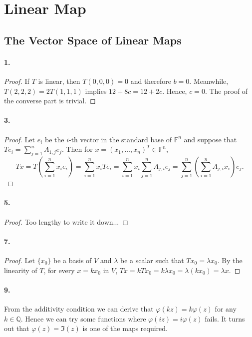 \section{Linear Map}
\subsection{The Vector Space of Linear Maps}
  \paragraph{1.}
  \begin{proof}
    If $T$ is linear, then $T(0,0,0)=0$ and therefore $b=0$. Meanwhile, 
    $T(2,2,2)=2T(1,1,1)$ implies $12+8c=12+2c$. Hence, $c=0$. The proof of the 
    converse part is trivial.
  \end{proof}

  \paragraph{3.}
  \begin{proof}
    Let $e_i$ be the $i$-th vector in the standard base of $\mathbb{F}^n$ and 
    suppose that $Te_i = \sum_{j=1}^n A_{1,j}e_j$. Then for $x=(x_1,\dots,x_n)^T 
    \in\mathbb{F}^n$,
    \[
      Tx = T\left(\sum_{i=1}^n x_ie_i\right) = \sum_{i=1}^n x_iTe_i =
      \sum_{i=1}^n x_i\sum_{j=1}^nA_{j,i}e_j = 
      \sum_{j=1}^n\left(\sum_{i=1}^nA_{j,i}x_i\right) e_j.
    \]
  \end{proof}

  \paragraph{5.}
  \begin{proof}
    Too lengthy to write it down...
  \end{proof}

  \paragraph{7.}
  \begin{proof}
    Let $\{x_0\}$ be a basis of $V$ and $\lambda$ be a scalar such that $Tx_0=
    \lambda x_0$. By the linearity of $T$, for every $x=kx_0$ in $V$, $Tx=kTx_0
    =k\lambda x_0=\lambda(kx_0)=\lambda x$.
  \end{proof}

  \paragraph{9.}
  \begin{solution}
    From the additivity condition we can derive that $\varphi(kz)=k\varphi(z)$
    for any $k\in\mathbb{Q}$. Hence we can try some functions where $\varphi(iz)
    =i\varphi(z)$ fails. It turns out that $\varphi(z)=\Im(z)$ is one of the 
    maps required.
  \end{solution}

